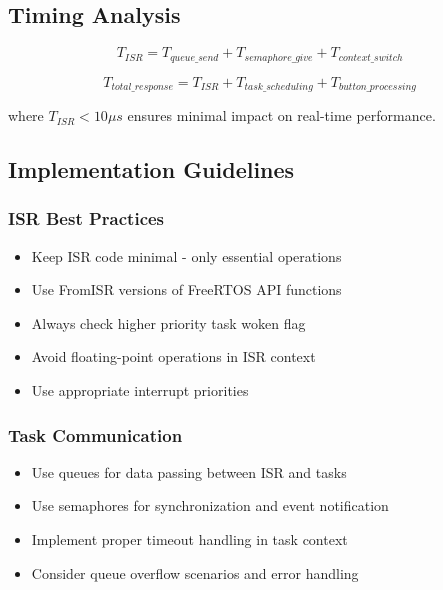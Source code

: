 \documentclass{article}
\begin{document}
\subsection{Timing Analysis}

\begin{equation}
T_{ISR} = T_{queue\_send} + T_{semaphore\_give} + T_{context\_switch}
\end{equation}

\begin{equation}
T_{total\_response} = T_{ISR} + T_{task\_scheduling} + T_{button\_processing}
\end{equation}

where $T_{ISR} < 10\mu s$ ensures minimal impact on real-time performance.

\subsection{Implementation Guidelines}

\subsubsection{ISR Best Practices}

\begin{itemize}
    \item Keep ISR code minimal - only essential operations
    \item Use FromISR versions of FreeRTOS API functions
    \item Always check higher priority task woken flag
    \item Avoid floating-point operations in ISR context
    \item Use appropriate interrupt priorities
\end{itemize}

\subsubsection{Task Communication}

\begin{itemize}
    \item Use queues for data passing between ISR and tasks
    \item Use semaphores for synchronization and event notification
    \item Implement proper timeout handling in task context
    \item Consider queue overflow scenarios and error handling
\end{itemize}
\end{document}
